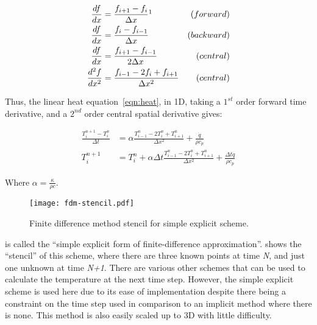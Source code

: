 
\begin{subequations}
\begin{align}
\frac{df}{dx} &= \frac{f_{i+1} - f_{i}}{\Delta x}\footnotemark  &(forward) \label{eqn:fdmfwd}\\
\frac{df}{dx} &= \frac{f_{i} - f_{i-1}}{\Delta x}  &(backward) \label{eqn:fdmbck}\\
\frac{df}{dx} &= \frac{f_{i+1} - f_{i-1}}{2\Delta x}  &(central)\label{eqn:fdmcent}\\
\frac{d^2f}{dx^2} &= \frac{f_{i-1}-2f_i+f_{i+1}}{\Delta x^2} &(central)\label{eqn:fdmcent2}
\end{align}
\end{subequations}

Thus, the linear heat equation~\cref{eqn:heat}, in 1D, taking a $1^{st}$ order forward time derivative, and a $2^{nd}$ order central spatial derivative gives:

\begin{subequations}
\begin{align}
\frac{T^{n+1}_i-T^{n}_i}{\Delta t} &= \alpha\frac{T^n_{i-1}-2T^n_{i}+T^n_{i+1}}{\Delta x^2}  + \frac{\dot{q}}{\rho c_p}\\
T_{i}^{n+1} &=  T_i^n + \alpha\Delta t \frac{T_{i-1}^n-2T_i^n+T_{i+1}^n}{\Delta x^2} + \frac{\Delta t\dot{q}}{\rho c_p}
\label{eqn:simplefdm}
\end{align}
\end{subequations}

Where $\alpha=\tfrac{\kappa}{\rho c}$.

\begin{figure}
  \begin{center}
    \texttt{[image: fdm-stencil.pdf]}
  \end{center}
  \caption{Finite difference method stencil for simple explicit scheme.}
  \label{fig:fdmstencil}
\end{figure}

 is called the ``simple explicit form of finite-difference approximation''\cite{ozisik1994finite}.  shows the ``stencil'' of this scheme, where there are three known points at time \textit{N}, and just one unknown at time \textit{N+1}. There are various other schemes that can be used to calculate the temperature at the next time step. However, the simple explicit scheme is used here due to its ease of implementation despite there being a constraint on the time step used in comparison to an implicit method where there is none. This method is also easily scaled up to 3D with little difficulty.

